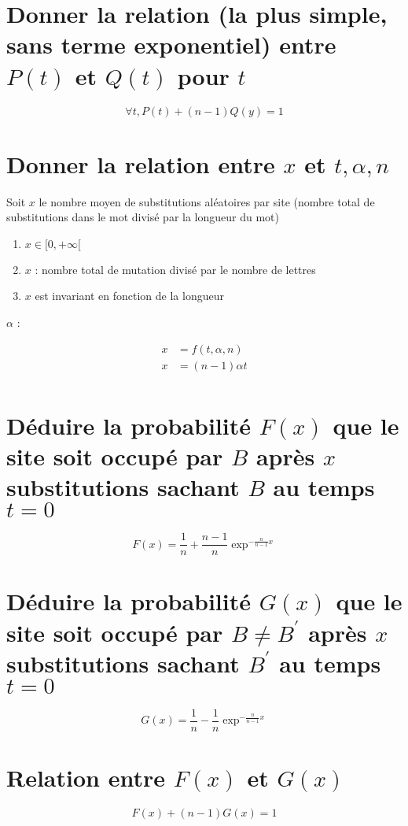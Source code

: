 \documentclass[11pt,a4paper]{article}
\begin{document}
	\section{Donner la relation (la plus simple, sans terme exponentiel) entre $P(t)$ et $Q(t)$ pour $t$}
	
	$$\forall t, P(t) + (n - 1)Q(y) = 1$$
	
	\section{Donner la relation entre $x$ et $t, \alpha, n$}
	
	Soit $x$ le nombre moyen de substitutions aléatoires par site (nombre total de substitutions dans le mot divisé par la longueur du mot)
	
	\begin{enumerate}
		\item $x \in [0, +\infty[$
		\item $x$ : nombre total de mutation divisé par le nombre de lettres
		\item $x$ est invariant en fonction de la longueur
	\end{enumerate}
	
	$\alpha$ : 
	
	\begin{align*}
		x &= f(t, \alpha, n)\\
		x &= (n - 1)\alpha t\\
	\end{align*}
	
	\section{Déduire la probabilité $F(x)$ que le site soit occupé par $B$ après $x$ substitutions sachant $B$ au temps $t=0$}
	
	$$F(x) = \frac{1}{n} + \frac{n - 1}{n}\exp^{-\frac{n}{n-1}x}$$
	
	\section{Déduire la probabilité $G(x)$ que le site soit occupé par $B \neq B^{\prime}$ après $x$ substitutions sachant $B^{\prime}$ au temps $t = 0$}
	
	$$G(x) = \frac{1}{n} - \frac{1}{n}\exp^{-\frac{n}{n-1}x}$$
	
	\section{Relation entre $F(x)$ et $G(x)$}
	
	$$F(x) + (n - 1)G(x) = 1$$
	
	
	
\end{document}
